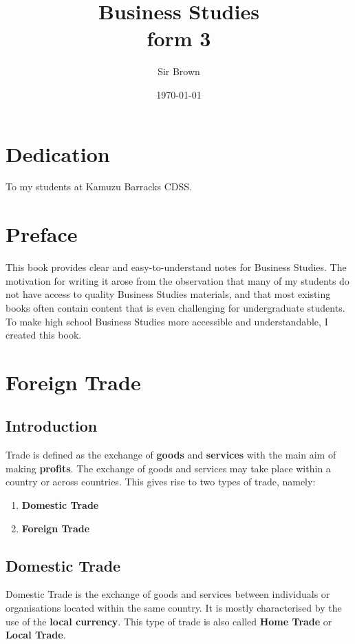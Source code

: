 \documentclass[12pt,a4paper, openany]{book}
\begin{document}
\frontmatter
\title{Business Studies \\ form 3}
\author{Sir Brown}
\date{\today}

\maketitle

\chapter*{Dedication}
To my students at Kamuzu Barracks CDSS.

\chapter*{Preface}
This book provides clear and easy-to-understand notes for Business Studies.
The motivation for writing it arose from the observation that many of my students
do not have access to quality Business Studies materials, and that most existing
books often contain content that is even challenging for undergraduate students.
To make high school Business Studies more accessible and understandable,
I created this book.

\tableofcontents

\mainmatter
\chapter{Foreign Trade}

\section{Introduction}
Trade is defined as the exchange of \textbf{goods} and \textbf{services} with the main aim of making \textbf{profits}.
The exchange of goods and services may take place within a country or across countries.
This gives rise to two types of trade, namely:
\begin{enumerate}
	\item \textbf{Domestic Trade}
	\item \textbf{Foreign Trade}
\end{enumerate}

\section{Domestic Trade}
Domestic Trade is the exchange of goods and services between individuals or organisations located within the same country.
It is mostly characterised by the use of the \textbf{local currency}.
This type of trade is also called \textbf{Home Trade} or \textbf{Local Trade}.
\end{document}

